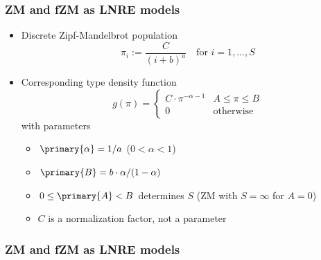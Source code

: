 \documentclass[handout,notes=show,t]{beamer} %
\begin{document}
\begin{frame}
  \frametitle{ZM and fZM as LNRE models}

  \begin{itemize}
  \item Discrete Zipf-Mandelbrot population
    \[
      \pi_i := \frac{C}{(i + b) ^ a} \quad \text{for } i = 1, \ldots, S
    \]
  \item<2-> Corresponding type density function \citep{Evert:04}
    \[
      g(\pi) =
      \begin{cases}
        C\cdot \pi^{-\alpha-1} & A \leq \pi \leq B\\
        0 & \text{otherwise}
      \end{cases}
    \]
    with parameters
    \begin{itemize}
    \item $\primary{\alpha} = 1 / a$ ($0 < \alpha < 1$)
    \item $\primary{B} = b \cdot \alpha / (1 - \alpha)$
    \item $0 \leq \primary{A} < B$ determines $S$ (ZM with $S = \infty$ for $A = 0$)
    \item[\hand] $C$ is a normalization factor, not a parameter
    \end{itemize}
  \end{itemize}
\end{frame}

\begin{frame}[c]
  \frametitle{ZM and fZM as LNRE models}

  \centering
\end{frame}
\end{document}
